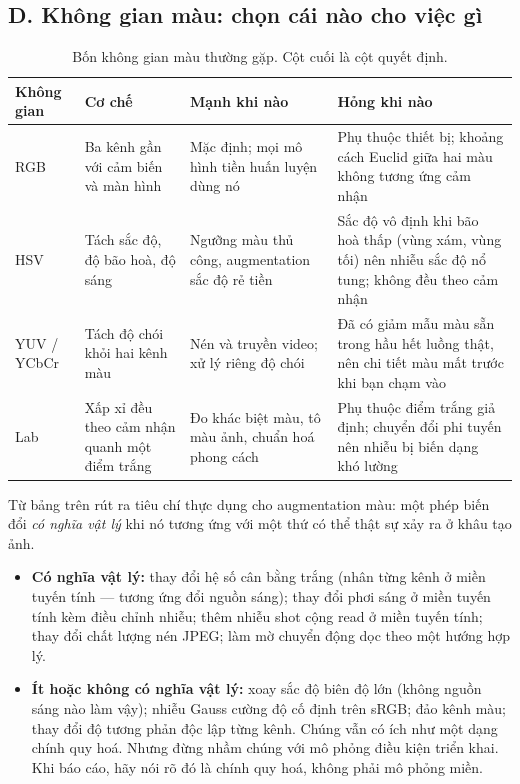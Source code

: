 \documentclass[../../../deep_learning.tex]{subfiles}
\begin{document}
\subsection{D. Không gian màu: chọn cái nào cho việc gì}
\begin{table}[H]\centering\small
\caption{Bốn không gian màu thường gặp. Cột cuối là cột quyết định.}
\label{tab:khong-gian-mau}
\begin{tabularx}{\linewidth}{@{}L{1.5cm}L{3.0cm}YL{4.0cm}@{}}
\toprule
\textbf{Không gian} & \textbf{Cơ chế} & \textbf{Mạnh khi nào} & \textbf{Hỏng khi nào}\\
\midrule
RGB & Ba kênh gần với cảm biến và màn hình & Mặc định; mọi mô hình tiền huấn luyện dùng nó & Phụ thuộc thiết bị; khoảng cách Euclid giữa hai màu không tương ứng cảm nhận\\
HSV & Tách sắc độ, độ bão hoà, độ sáng & Ngưỡng màu thủ công, augmentation sắc độ rẻ tiền & Sắc độ vô định khi bão hoà thấp (vùng xám, vùng tối) nên nhiễu sắc độ nổ tung; không đều theo cảm nhận\\
YUV / YCbCr & Tách độ chói khỏi hai kênh màu & Nén và truyền video; xử lý riêng độ chói & Đã có giảm mẫu màu sẵn trong hầu hết luồng thật, nên chi tiết màu mất trước khi bạn chạm vào\\
Lab & Xấp xỉ đều theo cảm nhận quanh một điểm trắng & Đo khác biệt màu, tô màu ảnh, chuẩn hoá phong cách & Phụ thuộc điểm trắng giả định; chuyển đổi phi tuyến nên nhiễu bị biến dạng khó lường\\
\bottomrule
\end{tabularx}
\end{table}


Từ bảng trên rút ra tiêu chí thực dụng cho augmentation màu: một phép biến đổi \emph{có nghĩa vật lý} khi nó tương ứng với một thứ có thể thật sự xảy ra ở khâu tạo ảnh.

\begin{itemize}
\item \textbf{Có nghĩa vật lý:} thay đổi hệ số cân bằng trắng (nhân từng kênh ở miền tuyến tính --- tương ứng đổi nguồn sáng); thay đổi phơi sáng ở miền tuyến tính kèm điều chỉnh nhiễu; thêm nhiễu shot cộng read ở miền tuyến tính; thay đổi chất lượng nén JPEG; làm mờ chuyển động dọc theo một hướng hợp lý.
\item \textbf{Ít hoặc không có nghĩa vật lý:} xoay sắc độ biên độ lớn (không nguồn sáng nào làm vậy); nhiễu Gauss cường độ cố định trên sRGB; đảo kênh màu; thay đổi độ tương phản độc lập từng kênh. Chúng vẫn có ích như một dạng chính quy hoá. Nhưng đừng nhầm chúng với mô phỏng điều kiện triển khai. Khi báo cáo, hãy nói rõ đó là chính quy hoá, không phải mô phỏng miền.
\end{itemize}
\end{document}
